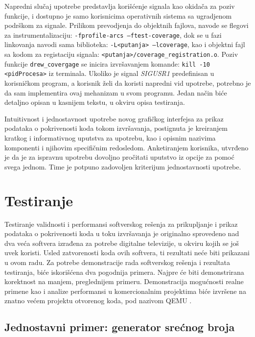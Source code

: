 \documentclass[12pt,oneside]{memoir}
\newcommand{\kod}[1]{\texttt{#1}}
\newcommand{\strano}[1]{\textit{#1}}
\begin{document}
Napredni slučaj upotrebe predstavlja korišćenje signala kao okidača za poziv funkcije, i dostupno je samo korisnicima operativnih sistema sa ugradjenom podrškom za signale. Prilikom prevodjenja do objektnih fajlova, navode se flegovi za instrumentalizaciju: \kod{-fprofile-arcs –ftest-coverage}, dok se u fazi linkovanja navodi sama biblioteka: \kod{-L<putanja> –lcoverage}, kao i objektni fajl sa kodom za registaciju signala: \kod{<putanja>/coverage\_registration.o}. Poziv funkcije \kod{drew\_covergage} se inicira izvršavanjem komande: \kod{kill -10 <pidProcesa>} iz terminala. Ukoliko je signal \strano{SIGUSR1} predefinisan u korisničkom program, a korisnik želi da koristi napredni vid upotrebe, potrebno je da sam implementira ovaj mehanizam u svom programu. Jedan način biće detaljno opisan u kasnijem tekstu, u okviru opisa testiranja. 

Intuitivnost i jednostavnost upotrebe novog grafičkog interfejsa za prikaz podataka o pokrivenosti koda tokom izvršavanja, postignuta je kreiranjem kratkog i informativnog uputstva za upotrebu, kao i opisnim nazivima komponenti i njihovim specifičnim redosledom. Anketiranjem korisnika, utvrđeno je da je za ispravnu upotrebu dovoljno pročitati uputstvo iz opcije za pomoć svega jednom. Time je potpuno zadovoljen kriterijum jednostavnosti upotrebe. 

\section{Testiranje}

Testiranje validnosti i performansi softverskog rešenja za prikupljanje i prikaz podataka o pokrivenosti koda u toku izvršavanja je originalno sprovedeno nad dva veća softvera izrađena za potrebe digitalne televizije, u okviru kojih se još uvek koristi. Usled zatvorenosti koda ovih softvera, ti rezultati neće biti prikazani u ovom radu. Za potrebe demonstracije rada softverskog rešenja i rezultata testiranja, biće iskorišćena dva pogodnija primera. Najpre će biti demonstrirana korektnost na manjem, preglednijem primeru. Demonstracija mogućnosti realne primene kao i analize performansi u komercionalnim projektima biće izvršene na znatno većem projektu otvorenog koda, pod nazivom QEMU \cite{QEMU}. 

\subsection{Jednostavni primer: generator srećnog broja}
\end{document}
